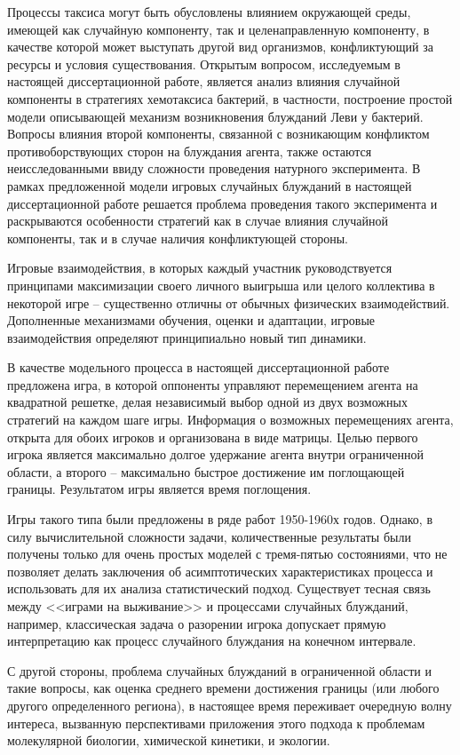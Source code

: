 Процессы таксиса могут быть обусловлены влиянием окружающей среды, имеющей как случайную компоненту, так и целенаправленную компоненту, в качестве которой может выступать другой вид организмов, конфликтующий за ресурсы и условия существования. Открытым вопросом, исследуемым в настоящей диссертационной работе, является анализ влияния случайной компоненты в стратегиях хемотаксиса бактерий, в частности, построение простой модели описывающей механизм возникновения блужданий Леви у бактерий. Вопросы влияния второй компоненты, связанной с возникающим конфликтом противоборствующих сторон на блуждания агента, также остаются неисследованными ввиду сложности проведения натурного эксперимента. В рамках предложенной модели игровых случайных блужданий в настоящей диссертационной работе решается проблема проведения такого эксперимента и раскрываются особенности стратегий как в случае влияния случайной компоненты, так и в случае наличия конфликтующей стороны. 

Игровые взаимодействия, в которых каждый участник руководствуется принципами максимизации своего личного выигрыша или целого коллектива в некоторой игре -- существенно отличны от обычных физических взаимодействий. Дополненные механизмами обучения, оценки и адаптации, игровые взаимодействия определяют принципиально новый тип динамики.

В качестве модельного процесса в настоящей диссертационной работе предложена игра, в которой оппоненты управляют перемещением агента на квадратной решетке, делая независимый выбор одной из двух возможных стратегий на каждом шаге игры. Информация о возможных перемещениях агента, открыта для обоих игроков и организована в виде матрицы. Целью первого игрока является максимально долгое удержание агента внутри ограниченной области, а второго -- максимально быстрое достижение им поглощающей границы. Результатом игры является время поглощения. 

Игры такого типа были предложены в ряде работ 1950-1960х годов. Однако, в силу вычислительной сложности задачи, количественные результаты были получены только для очень простых моделей с тремя-пятью состояниями, что не позволяет делать заключения об асимптотических характеристиках процесса и использовать для их анализа статистический подход. Существует тесная связь между <<играми на выживание>> и процессами случайных блужданий, например, классическая задача о разорении игрока допускает прямую интерпретацию как процесс случайного блуждания на конечном интервале. 

С другой стороны, проблема случайных блужданий в ограниченной области и такие вопросы, как оценка среднего времени достижения границы (или любого другого определенного региона), в настоящее время переживает очередную волну интереса, вызванную перспективами приложения этого подхода к проблемам молекулярной биологии, химической кинетики, и экологии. 

